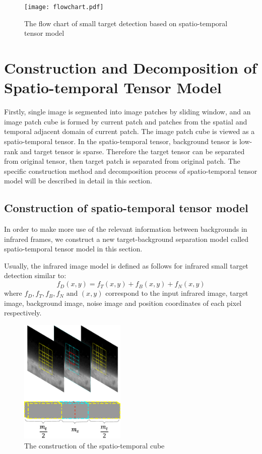 \documentclass[journal]{IEEEtran}
\begin{document}
\begin{figure}[htb]
  \centering
  \texttt{[image: flowchart.pdf]}
  \caption{The flow chart of small target detection based on spatio-temporal tensor model}
  \label{fig:flow_chart}
\end{figure}


\section{Construction and Decomposition of Spatio-temporal Tensor Model}
Firstly, single image is segmented into image patches by sliding window, and an image patch cube is formed by current patch and patches from the spatial and temporal adjacent domain of current patch. The image patch cube is viewed as a spatio-temporal tensor. In the spatio-temporal tensor, background tensor is low-rank and target tensor is sparse. Therefore the target tensor can be separated from original tensor, then target patch is separated from original patch. The specific construction method and decomposition process of spatio-temporal tensor model will be described in detail in this section.


\subsection{Construction of spatio-temporal tensor model}
In order to make more use of the relevant information between backgrounds in infrared frames, we construct a new target-background separation model called spatio-temporal tensor model in this section. 

Usually, the infrared image model is defined as follows for infrared small target detection similar to\cite{gu2010kernel}:
\begin{equation}
  f_D(x,y)=f_T(x,y)+f_B(x,y)+f_N(x,y)
  \label{eq:image_model}
\end{equation}
where $f_D,f_T,f_B,f_N \text{ and } (x,y)$ correspond to the input infrared image, target image, background image, noise image and position coordinates of each pixel respectively.

\begin{figure}[H]
  \centering
  \includegraphics[width=0.45\textwidth]{construction.eps}
  \caption{The construction of the spatio-temporal cube}
  \label{construction}
\end{figure}
\end{document}
